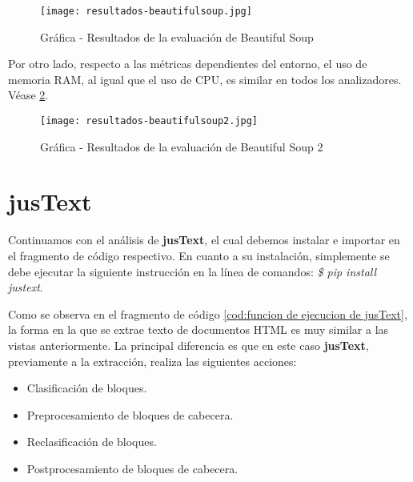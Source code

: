 \begin{figure}[tphb]
    \centering
    \texttt{[image: resultados-beautifulsoup.jpg]}
    \caption{Gráfica - Resultados de la evaluación de Beautiful Soup}
    \label{img:grafica - resultados de la evaluacion de beautiful soup}
\end{figure}

Por otro lado, respecto a las métricas dependientes del entorno, el uso de memoria RAM, al igual que el uso
de CPU, es similar en todos los analizadores. Véase \ref{img:grafica - resultados de la evaluacion de beautiful soup 2}.

\begin{figure}[tphb]
    \centering
    \texttt{[image: resultados-beautifulsoup2.jpg]}
    \caption{Gráfica - Resultados de la evaluación de Beautiful Soup 2}
    \label{img:grafica - resultados de la evaluacion de beautiful soup 2}
\end{figure}

\section*{jusText}

Continuamos con el análisis de \textbf{jusText}, el cual debemos instalar e importar en el fragmento de 
código respectivo. En cuanto a su instalación, simplemente se debe ejecutar la siguiente instrucción en la 
línea de comandos: \emph{\$ pip install justext}.

Como se observa en el fragmento de código \ref{cod:funcion de ejecucion de jusText}, la forma en la que
se extrae texto de documentos HTML es muy similar a las vistas anteriormente. La principal diferencia es
que en este caso \textbf{jusText}, previamente a la extracción, realiza las siguientes acciones:

\begin{itemize}
    \item Clasificación de bloques.
    \item Preprocesamiento de bloques de cabecera.
    \item Reclasificación de bloques.
    \item Postprocesamiento de bloques de cabecera.
\end{itemize}

\begin{codefloat}
    
    \caption{Función de ejecución de jusText}
    \label{cod:funcion de ejecucion de jusText}
\end{codefloat}

